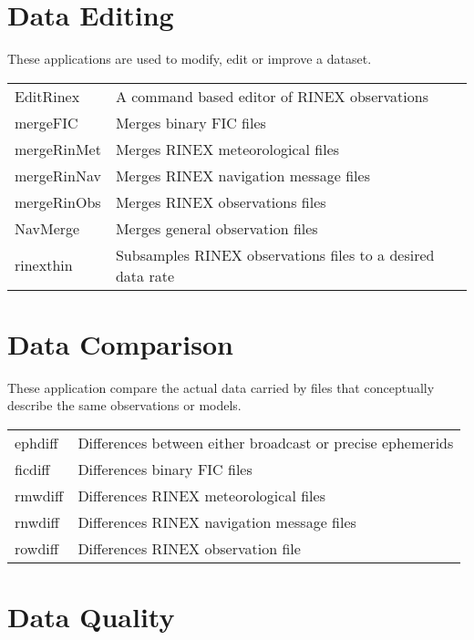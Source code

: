 \section{Data Editing}

These applications are used to modify, edit or improve a dataset.

\begin{center}
\begin{tabular} {|ll|} \hline
EditRinex   & A command based editor of RINEX observations \\
mergeFIC    & Merges binary FIC files \\
mergeRinMet & Merges RINEX meteorological files \\
mergeRinNav & Merges RINEX navigation message files \\
mergeRinObs & Merges RINEX observations files \\
NavMerge    & Merges general observation files \\
rinexthin   & Subsamples RINEX observations files to a desired data rate \\ \hline
\end{tabular}
\end{center}

\section{Data Comparison}

These application compare the actual data carried by files that conceptually describe the same observations or models.

\begin{center}
\begin{tabular} {|ll|} \hline
ephdiff  & Differences between either broadcast or precise ephemerids \\
ficdiff  & Differences binary FIC files \\
rmwdiff  & Differences RINEX meteorological files \\
rnwdiff  & Differences RINEX navigation message files \\
rowdiff  & Differences RINEX observation file \\  \hline
\end{tabular}
\end{center}

\section {Data Quality}

